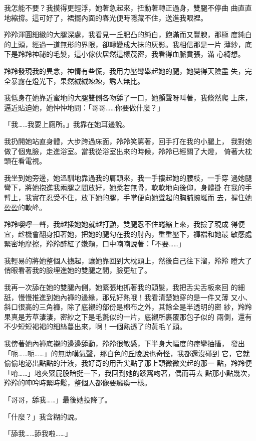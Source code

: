 我怎能不要？我摸得更輕浮，她著急起來，扭動著轉正過身，雙腿不停曲
曲直直地縮撐。這可好了，裙擺內面的春光便時隱藏不住，送進我眼裡。

羚羚渾圓細緻的大腿深處，我看見一丘肥凸的純白，飽滿而又豐腴，那極
度純白的上頭，經過一道無形的界限，卻轉變成大抹的灰影。我相信那是一片
薄紗，底下是羚羚神祕的毛髮，這小傢伙居然這樣茂密，我看得血脈賁張，滿
心綺想。

羚羚發現我的異念，神情有些慌，我用力壓彎舉起她的腿，她變得天險盡
失，完全暴露在燈光下，果然絨絨竦竦，誘人無比。

我低身在她靠近蜜地的大腿雙側各吻舔了一口，她顫聲呀叫著，我倏然爬
上床，逼近貼迫她，她忡忡地問：「哥哥……你要做什麼？」

「我……我要上廁所。」我靠在她耳邊說。

我扔開她站直身體，大步跨過床面，羚羚笑罵著，回手打在我的小腿上，
我對她做了個鬼臉，走進浴室。當我從浴室出來的時候，羚羚已經關了大燈，
倚著大枕頭在看電視。

我坐到她旁邊，她溫馴地靠過我的肩頭來，我一手摟起她的腰枝，一手穿
過她腿彎下，將她抱進我兩腿之間放好，她柔若無骨，軟軟地向後仰，身體掛
在我的手臂上，我實在忍受不住，放下她的腿，手掌便向她聳起的胸脯蜿蜒而
去，握住她盈盈的軟峰。

羚羚嚶嚀一聲，我越揉她她就越打顫，雙腿忍不住蜷縮上來，我撿了現成
得便宜，趁機會翻身扣著她，把她的腿勾在我的肘內，重重壓下，褲襠和她最
敏感處緊密地摩擦，羚羚醉紅了嫩頰，口中喃喃說著：「不要……」

我輕易的將她整個人擄起，讓她靠回到大枕頭上，然後自己往下溜，羚羚
瞪大了俏眼看著我的臉埋進她的雙腿之間，臉更紅了。

我再一次舔在她的雙腿內側，她緊張地抓著我的頭髮，我把舌尖舌板來回
的細舐，慢慢推進到她內褲的邊緣，那兒好熱哦！我看清楚她穿的是一件又薄
又小、斜口很高的三角褲，除了底襯的部份是棉布之外，其餘全是半透明的密
紗，羚羚果真是芳草淒淒，密紗之下是毛氈似的一片，底襯所裹覆那包子似的
兩側，還有不少短短褐褐的細絲蔓出來，啊！一個熟透了的黃毛丫頭。

我傍著她內褲底襯的邊邊舔動，羚羚很敏感，下半身大幅度的痙攣抽搐，
發出「呃……呃……」的無助嘆氣聲，那白色的丘陵說也奇怪，我都還沒碰到
它，它就偷偷地泌出點點的汁液，我好奇的用舌尖點了那上頭微微突起的那一
點，羚羚便「唷……」地夾緊屁股暗挺一下，我回到她的蹊窩吻著，偶而再去
點那小點幾次，羚羚的呻吟時緊時鬆，整個人都像要癱瘓一樣。

「哥哥，舔我……」最後她投降了。

「什麼？」我含糊的說。

「舔我……舔我啦……」

